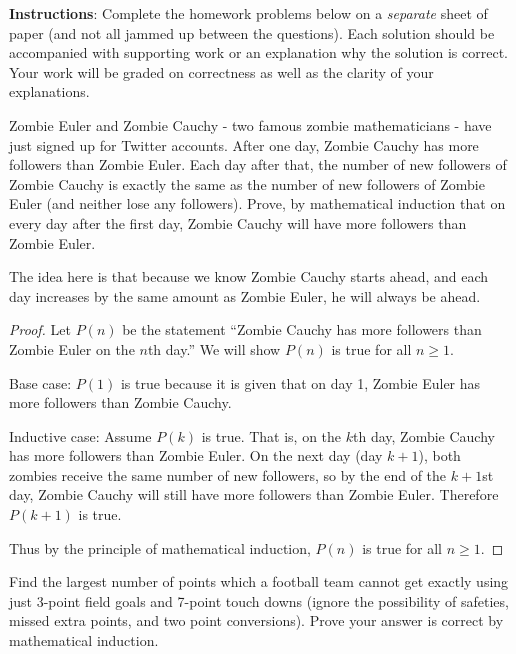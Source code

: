 \documentclass[11pt]{exam}
\begin{document}
\noindent \textbf{Instructions}: Complete the homework problems below on a {\em separate} sheet of paper (and not all jammed up between the questions). Each solution should be accompanied with supporting work or an explanation why the solution is correct. Your work will be graded on correctness as well as the clarity of your explanations. 



\begin{questions}
\question[4] Zombie Euler and Zombie Cauchy - two famous zombie mathematicians - have just signed up for Twitter accounts.  After one day, Zombie Cauchy has more followers than Zombie Euler.  Each day after that, the number of new followers of Zombie Cauchy is exactly the same as the number of new followers of Zombie Euler (and neither lose any followers).  Prove, by mathematical induction that on every day after the first day, Zombie Cauchy will have more followers than Zombie Euler.

\begin{solution}
  The idea here is that because we know Zombie Cauchy starts ahead, and each day increases by the same amount as Zombie Euler, he will always be ahead.
  
  \begin{proof}
    Let $P(n)$ be the statement ``Zombie Cauchy has more followers than Zombie Euler on the $n$th day.''  We will show $P(n)$ is true for all $n \ge 1$.
    
    Base case: $P(1)$ is true because it is given that on day 1, Zombie Euler has more followers than Zombie Cauchy.
    
    Inductive case: Assume $P(k)$ is true.  That is, on the $k$th day, Zombie Cauchy has more followers than Zombie Euler.  On the next day (day $k+1$), both zombies receive the same number of new followers, so by the end of the $k+1$st day, Zombie Cauchy will still have more followers than Zombie Euler.  Therefore $P(k+1)$ is true.
    
    Thus by the principle of mathematical induction, $P(n)$ is true for all $n \ge 1$.
  \end{proof}

\end{solution}


\question[4] Find the largest number of points which a football team cannot get exactly using just 3-point field goals and 7-point touch downs (ignore the possibility of safeties, missed extra points, and two point conversions).  Prove your answer is correct by mathematical induction.


\end{questions}
\end{document}
